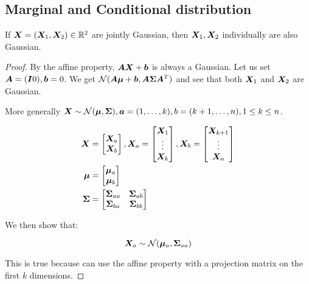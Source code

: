 \begin{tcolorbox}
    \section{Marginal and Conditional distribution}
    
    If ${\bm{X}} = ({\bm{X}}_1, {\bm{X}}_2) \in {\mathbb{R}}^2$ are jointly Gaussian, then ${\bm{X}}_1, {\bm{X}}_2$ individually are also Gaussian. 
    
    \begin{proof}
    By the affine property, ${\bm{A}} {\bm{X}} + {\bm{b}}$ is always a Gaussian. Let us set ${\bm{A}} = ({\bm{I}} 0), {\bm{b}} = 0$. We get ${\mathcal{N}}({\bm{A}} {\bm{\mu}} + {\bm{b}}, {\bm{A}} {\bm{\Sigma}} {\bm{A}}^T)$ and see that both ${\bm{X}}_1$ and ${\bm{X}}_2$ are Gaussian.
    
    More generally ${\bm{X}} \sim {\mathcal{N}}({\bm{\mu}}, {\bm{\Sigma}}), {\bm{a}} = (1, \dots, k), b = (k+1, \dots, n), 1 \leq k \leq n$.
    
    \begin{align}
        {\bm{X}} &= \begin{bmatrix} {\bm{X}}_a \\ {\bm{X}}_b \end{bmatrix},
        {\bm{X}}_a = \begin{bmatrix} {\bm{X}}_1 \\ \vdots \\ {\bm{X}}_k \end{bmatrix},
        {\bm{X}}_b = \begin{bmatrix} {\bm{X}}_{k+1} \\ \vdots \\ {\bm{X}}_n \end{bmatrix} \\
        {\bm{\mu}} &= \begin{bmatrix} {\bm{\mu}}_a \\ {\bm{\mu}}_b \end{bmatrix} \\
        {\bm{\Sigma}} &= \begin{bmatrix}
            {\bm{\Sigma}}_{aa} & {\bm{\Sigma}}_{ab} \\
            {\bm{\Sigma}}_{ba} & {\bm{\Sigma}}_{bb}
        \end{bmatrix}
    \end{align}
    
    We then show that:
    
    \begin{equation}
    {\bm{X}}_a \sim {\mathcal{N}}({\bm{\mu}}_a, {\bm{\Sigma}}_{aa})
    \end{equation}
    
    This is true because can use the affine property with a projection matrix on the first $k$ dimensions.
    

\end{proof}
\end{tcolorbox}
